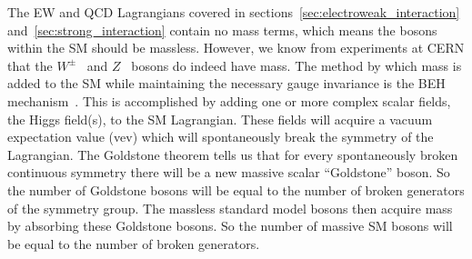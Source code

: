 The EW and QCD Lagrangians covered in sections~\ref{sec:electroweak_interaction} and~\ref{sec:strong_interaction} contain no mass terms, which means the bosons within the SM should be massless.
However, we know from experiments at CERN that the $W^{\pm}$~\cite{ARNISON1983103} and $Z$~\cite{1983398} bosons do indeed have mass.
The method by which mass is added to the SM while maintaining the necessary gauge invariance is the BEH mechanism~\cite{PhysRevLett.13.321,PhysRevLett.13.508}.
This is accomplished by adding one or more complex scalar fields, the Higgs field(s), to the SM Lagrangian.
These fields will acquire a vacuum expectation value (vev) which will spontaneously break the symmetry of the Lagrangian.
The Goldstone theorem tells us that for every spontaneously broken continuous symmetry there will be a new massive scalar ``Goldstone'' boson.
So the number of Goldstone bosons will be equal to the number of broken generators of the symmetry group.
The massless standard model bosons then acquire mass by absorbing these Goldstone bosons.
So the number of massive SM bosons will be equal to the number of broken generators.

